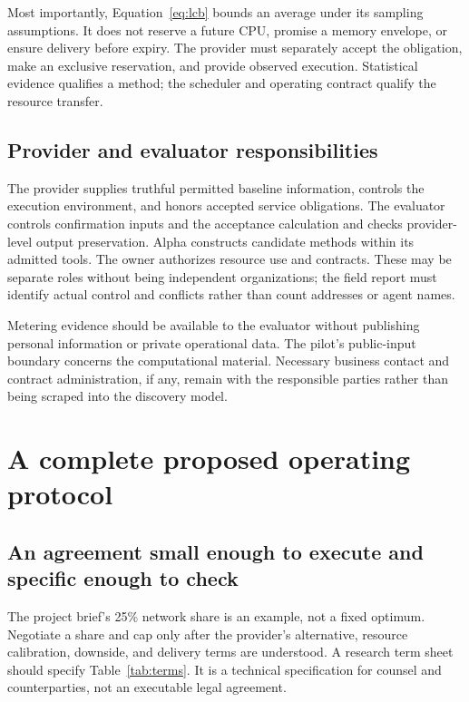 \documentclass[11pt,letterpaper]{article}
\theoremstyle{remark}\newtheorem{remark}{Remark}[section]
\begin{document}
Most importantly, Equation~\eqref{eq:lcb} bounds an average under its sampling assumptions. It does not reserve a future CPU, promise a memory envelope, or ensure delivery before expiry. The provider must separately accept the obligation, make an exclusive reservation, and provide observed execution. Statistical evidence qualifies a method; the scheduler and operating contract qualify the resource transfer.

\subsection{Provider and evaluator responsibilities}
The provider supplies truthful permitted baseline information, controls the execution environment, and honors accepted service obligations. The evaluator controls confirmation inputs and the acceptance calculation and checks provider-level output preservation. Alpha constructs candidate methods within its admitted tools. The owner authorizes resource use and contracts. These may be separate roles without being independent organizations; the field report must identify actual control and conflicts rather than count addresses or agent names.

Metering evidence should be available to the evaluator without publishing personal information or private operational data. The pilot's public-input boundary concerns the computational material. Necessary business contact and contract administration, if any, remain with the responsible parties rather than being scraped into the discovery model.

\section{A complete proposed operating protocol}
\label{sec:protocol}
\subsection{An agreement small enough to execute and specific enough to check}
The project brief's 25\% network share is an example, not a fixed optimum. Negotiate a share and cap only after the provider's alternative, resource calibration, downside, and delivery terms are understood. A research term sheet should specify Table~\ref{tab:terms}. It is a technical specification for counsel and counterparties, not an executable legal agreement.
\end{document}
